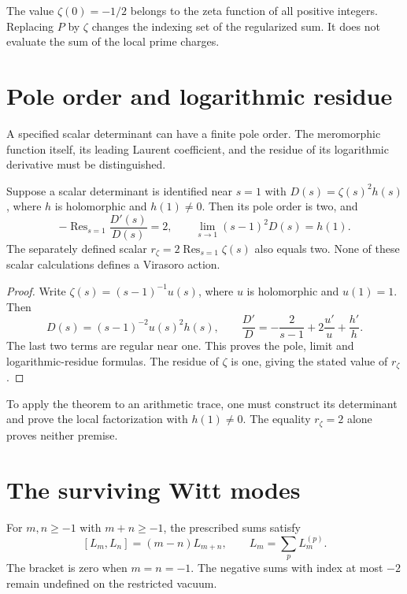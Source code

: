 \begin{remark}
The value \(\zeta(0)=-1/2\) belongs to the zeta function
of all positive integers. Replacing \(P\) by \(\zeta\)
changes the indexing set of the regularized sum.
It does not evaluate the sum of the local prime charges.
\end{remark}

\section{Pole order and logarithmic residue}
\label{v4-arith:pol:c-as-residue}

A specified scalar determinant can have a finite pole order.
The meromorphic function itself, its leading Laurent coefficient,
and the residue of its logarithmic derivative must be distinguished.

\begin{theorem}\label{v4-arith:thm:regularised-c}
Suppose a scalar determinant is identified near \(s=1\) with
\(D(s)=\zeta(s)^2h(s)\), where \(h\) is holomorphic and
\(h(1)\ne0\). Then its pole order is two, and
\[
 -\operatorname{Res}_{s=1}\frac{D'(s)}{D(s)}=2,
 \qquad \lim_{s\to1}(s-1)^2D(s)=h(1).
\]
The separately defined scalar
\(r_\zeta=2\operatorname{Res}_{s=1}\zeta(s)\) also equals two.
None of these scalar calculations defines a Virasoro action.
\end{theorem}

\begin{proof}
Write \(\zeta(s)=(s-1)^{-1}u(s)\), where \(u\) is
holomorphic and \(u(1)=1\). Then
\[
 D(s)=(s-1)^{-2}u(s)^2h(s),\qquad
 \frac{D'}D=-\frac2{s-1}+2\frac{u'}u+\frac{h'}h.
\]
The last two terms are regular near one.
This proves the pole, limit and logarithmic-residue formulas.
The residue of \(\zeta\) is one, giving the stated value
of \(r_\zeta\).
\end{proof}

To apply the theorem to an arithmetic trace, one must construct
its determinant and prove the local factorization with \(h(1)\ne0\).
The equality \(r_\zeta=2\) alone proves neither premise.

\section{The surviving Witt modes}
\label{v4-arith:pol:witt-virasoro}

\begin{theorem}\label{v4-arith:thm:witt-virasoro}
For \(m,n\geq-1\) with \(m+n\geq-1\), the prescribed sums satisfy
\[
 [L_m,L_n]=(m-n)L_{m+n},
 \qquad L_m=\sum_pL_m^{(p)}.
\]
The bracket is zero when \(m=n=-1\).
The negative sums with index at most \(-2\) remain undefined
on the restricted vacuum.
\end{theorem}

